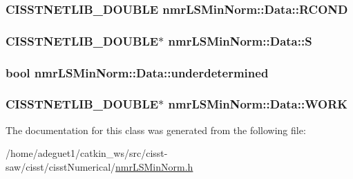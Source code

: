 \hypertarget{classnmr_l_s_min_norm_1_1_data_a316a55d64f37b94fc0c15d1283cd1426}{
\subsubsection[{R\-C\-O\-N\-D}]{\setlength{\rightskip}{0pt plus 5cm}C\-I\-S\-S\-T\-N\-E\-T\-L\-I\-B\-\_\-\-D\-O\-U\-B\-L\-E nmr\-L\-S\-Min\-Norm\-::\-Data\-::\-R\-C\-O\-N\-D}}\label{classnmr_l_s_min_norm_1_1_data_a316a55d64f37b94fc0c15d1283cd1426}
\hypertarget{classnmr_l_s_min_norm_1_1_data_afee9998d9b61d300a4e9403e8189aede}{
\subsubsection[{S}]{\setlength{\rightskip}{0pt plus 5cm}C\-I\-S\-S\-T\-N\-E\-T\-L\-I\-B\-\_\-\-D\-O\-U\-B\-L\-E$\ast$ nmr\-L\-S\-Min\-Norm\-::\-Data\-::\-S}}\label{classnmr_l_s_min_norm_1_1_data_afee9998d9b61d300a4e9403e8189aede}
\hypertarget{classnmr_l_s_min_norm_1_1_data_aa0ce32b53580c83249841c05d59400a9}{
\subsubsection[{underdetermined}]{\setlength{\rightskip}{0pt plus 5cm}bool nmr\-L\-S\-Min\-Norm\-::\-Data\-::underdetermined}}\label{classnmr_l_s_min_norm_1_1_data_aa0ce32b53580c83249841c05d59400a9}
\hypertarget{classnmr_l_s_min_norm_1_1_data_a1b4ef9acbf885be856123c9d0c8cd67d}{
\subsubsection[{W\-O\-R\-K}]{\setlength{\rightskip}{0pt plus 5cm}C\-I\-S\-S\-T\-N\-E\-T\-L\-I\-B\-\_\-\-D\-O\-U\-B\-L\-E$\ast$ nmr\-L\-S\-Min\-Norm\-::\-Data\-::\-W\-O\-R\-K}}\label{classnmr_l_s_min_norm_1_1_data_a1b4ef9acbf885be856123c9d0c8cd67d}


The documentation for this class was generated from the following file\-:\begin{DoxyCompactItemize}
\item 
/home/adeguet1/catkin\-\_\-ws/src/cisst-\/saw/cisst/cisst\-Numerical/\hyperlink{nmr_l_s_min_norm_8h}{nmr\-L\-S\-Min\-Norm.\-h}\end{DoxyCompactItemize}
